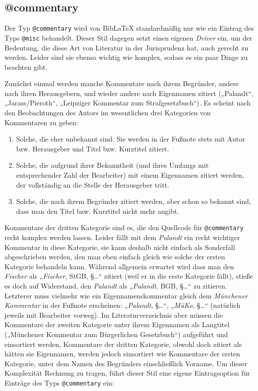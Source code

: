 \documentclass[11pt,a4paper,DIV=calc]{scrartcl}
\newcommand\software[1]{\textsf{#1}}
\newcommand\Biblatex{\software{Bib\LaTeX{}}\xspace}
\newcommand\name[1]{\textit{#1}}
\begin{document}
\subsection{@commentary}

Der Typ \verb+@commentary+ wird von \Biblatex standardmäßig nur wie
ein Eintrag des Typs \verb+@misc+ behandelt. Dieser Stil dagegen
setzt einen eigenen \emph{Driver} ein, um der Bedeutung, die diese Art
von Literatur in der Jurisprudenz hat, auch gerecht zu werden. Leider
sind sie ebenso wichtig wie komplex, sodass es ein paar Dinge zu
beachten gibt.

Zunächst einmal werden manche Kommentare nach ihrem Begründer, andere
nach ihren Herausgebern, und wieder andere nach Eigennamen zitiert
(„Palandt“, „Jarass/Pieroth“, „Leipziger Kommentar zum
Strafgesetzbuch“). Es scheint nach den Beobachtungen des Autors im
wesentlichen drei Kategorien von Kommentaren zu geben:

\begin{enumerate}
\item Solche, die eher unbekannt sind. Sie werden in der Fußnote stets
  mit Autor bzw. Herausgeber und Titel bzw. Kurztitel zitiert.
\item Solche, die aufgrund ihrer Bekanntheit (und ihres Umfangs mit
  entsprechender Zahl der Bearbeiter) mit einem Eigennamen zitiert
  werden, der vollständig an die Stelle der Herausgeber tritt.
\item Solche, die nach ihrem Begründer zitiert werden, aber schon so
  bekannt sind, dass man den Titel bzw. Kurztitel nicht mehr angibt.
\end{enumerate}

Kommentare der dritten Kategorie sind es, die den Quellcode für
\verb+@commentary+ recht komplex werden lassen. Leider fällt mit
dem \name{Palandt} ein recht wichtiger Kommentar in diese Kategorie,
sie kann deshalb nicht einfach als Sonderfall abgeschrieben werden,
den man eben einfach gleich wie solche der ersten Kategorie behandeln
kann. Während allgemein erwartet wird dass man den \name{Fischer} als
„\name{Fischer}, StGB, §…“ zitiert (weil er in die erste Kategorie
fällt), stieße es doch auf Widerstand, den \name{Palandt} als
„\name{Palandt}, BGB, §…“ zu zitieren. Letzterer muss vielmehr wie ein
Eigennamenskommentar gleich dem \name{Münchener Kommentar} in der
Fußnote erscheinen: „\name{Palandt}, §…“, „\name{MüKo}, §…“ (natürlich
jeweils mit Bearbeiter vorweg). Im Literaturverzeichnis aber müssen
die Kommentare der zweiten Kategorie unter ihrem Eigennamen als
Langtitel („Münchener Kommentar zum Bürgerlichen Gesetzbuch“)
aufgeführt und einsortiert werden, Kommentare der dritten Kategorie,
obwohl doch zitiert als hätten sie Eigennamen, werden jedoch
einsortiert wie Kommentare der ersten Kategorie, \dh unter dem Namen
des Begründers einschließlich Vorname. Um dieser Komplexität Rechnung
zu tragen, führt dieser Stil eine eigene Eintragsoption für Einträge
des Typs \verb+@commentary+ ein:
\end{document}
